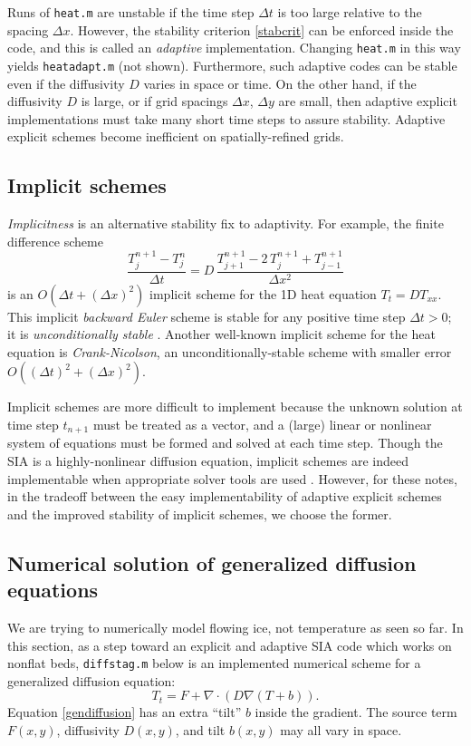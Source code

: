 \documentclass[letterpaper,final,12pt,reqno]{amsart}
\newcommand{\grad}{\nabla}
\newcommand{\Div}{\nabla\cdot}
\begin{document}
Runs of \texttt{heat.m} are unstable if the time step $\Delta t$ is too large relative to the spacing $\Delta x$.  However, the stability criterion \eqref{stabcrit} can be enforced inside the code, and this is called an \emph{adaptive} implementation.  Changing \texttt{heat.m} in this way yields \texttt{heatadapt.m} (not shown).  Furthermore, such adaptive codes can be stable even if the diffusivity $D$ varies in space or time.  On the other hand, if the diffusivity $D$ is large, or if grid spacings $\Delta x$, $\Delta y$ are small, then adaptive explicit implementations must take many short time steps to assure stability.  Adaptive explicit schemes become inefficient on spatially-refined grids.

\subsection*{Implicit schemes}  \emph{Implicitness} is an alternative stability fix to adaptivity.  For example, the finite difference scheme
\begin{equation}
  \frac{T_j^{n+1} - T_j^n}{\Delta t} = D\,\frac{T_{j+1}^{n+1} - 2\, T_j^{n+1} + T_{j-1}^{n+1}}{\Delta x^2} \label{implicit1D}
\end{equation}
is an $O(\Delta t + (\Delta x)^2)$ implicit scheme for the 1D heat equation $T_t = D T_{xx}$.  This implicit \emph{backward Euler} scheme is stable for any positive time step $\Delta t>0$; it is \emph{unconditionally stable} \cite{LeVequeFD,MortonMayers}.  Another well-known implicit scheme for the heat equation is \emph{Crank-Nicolson}, an unconditionally-stable scheme with smaller error $O((\Delta t)^2 +(\Delta x)^2)$.

Implicit schemes are more difficult to implement because the unknown solution at time step $t_{n+1}$ must be treated as a vector, and a (large) linear or nonlinear system of equations must be formed and solved at each time step.  Though the SIA is a highly-nonlinear diffusion equation, implicit schemes are indeed implementable when appropriate solver tools are used \cite{Bueler2016}.  However, for these notes, in the tradeoff between the easy implementability of adaptive explicit schemes and the improved stability of implicit schemes, we choose the former. 

\subsection*{Numerical solution of generalized diffusion equations}  We are trying to numerically model flowing ice, not temperature as seen so far.  In this section, as a step toward an explicit and adaptive SIA code which works on nonflat beds, \texttt{diffstag.m} below is an implemented numerical scheme for a generalized diffusion equation:
\begin{equation}
  T_t = F + \Div \left(D \grad (T + b)\right). \label{gendiffusion}
\end{equation}
Equation \eqref{gendiffusion} has an extra ``tilt'' $b$ inside the gradient.  The source term $F(x,y)$, diffusivity $D(x,y)$, and tilt $b(x,y)$ may all vary in space.
\end{document}
